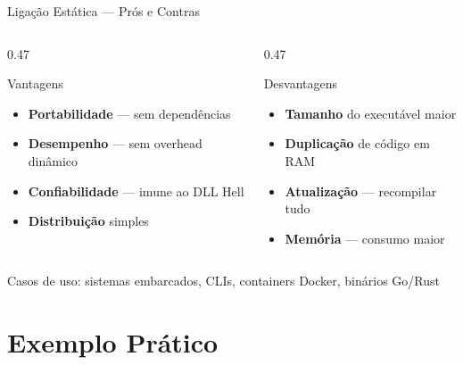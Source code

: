 \documentclass[aspectratio=169, 11pt]{beamer}
\begin{document}
\begin{frame}{Ligação Estática — Prós e Contras}
  \begin{columns}[T]
    \begin{column}{0.47\textwidth}
      \begin{exampleblock}{Vantagens}
        \begin{itemize}
          \item \textbf{Portabilidade} — sem dependências
          \item \textbf{Desempenho} — sem overhead dinâmico
          \item \textbf{Confiabilidade} — imune ao DLL Hell
          \item \textbf{Distribuição} simples
        \end{itemize}
      \end{exampleblock}
    \end{column}
    \begin{column}{0.47\textwidth}
      \begin{alertblock}{Desvantagens}
        \begin{itemize}
          \item \textbf{Tamanho} do executável maior
          \item \textbf{Duplicação} de código em RAM
          \item \textbf{Atualização} — recompilar tudo
          \item \textbf{Memória} — consumo maior
        \end{itemize}
      \end{alertblock}
    \end{column}
  \end{columns}
  \vspace{0.4cm}
  \begin{center}
    {\small\color{gray} Casos de uso: sistemas embarcados, CLIs, containers Docker, binários Go/Rust}
  \end{center}
\end{frame}

\section{Exemplo Prático}
\end{document}
